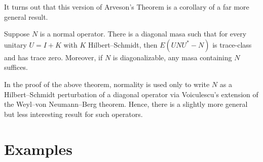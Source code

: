 \documentclass{article}
\begin{document}
It turns out that this version of Arveson's Theorem is a corollary of a far more general result.

\begin{theorem}
  Suppose $N$ is a normal operator.
  There is a diagonal masa such that for every unitary $U = I + K$ with $K$ Hilbert--Schmidt, then $E(UNU^{*}-N)$ is trace-class and has trace zero.
  Moreover, if $N$ is diagonalizable, any masa containing $N$ suffices.
\end{theorem}

\begin{remark}
  In the proof of the above theorem, normality is used only to write $N$ as a Hilbert--Schmidt perturbation of a diagonal operator via Voiculescu's extension of the Weyl--von Neumann--Berg theorem.
  Hence, there is a slightly more general but less interesting result for such operators.
\end{remark}

\framebreak

\section*{Examples}

\vfill
\end{document}
